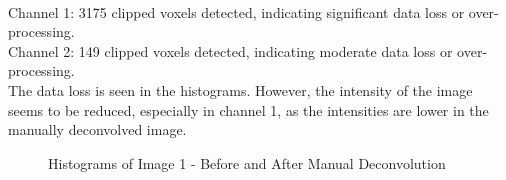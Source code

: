 \documentclass{article}
\begin{document}
\\ 
Channel 1: 3175 clipped voxels detected, indicating significant data loss or over-processing. \\
Channel 2: 149 clipped voxels detected, indicating moderate data loss or over-processing.\\
The data loss is seen in the histograms. However, the intensity of the image seems to be reduced, especially in channel 1, as the intensities are lower in the manually deconvolved image. 
\begin{figure}[h!]
\centering
{}
\vspace{5 mm}
\caption{Histograms of Image 1 - Before and After Manual Deconvolution}
\label{fig:manual-deconvolve-image1-histogram}
\end{figure}
\end{document}
